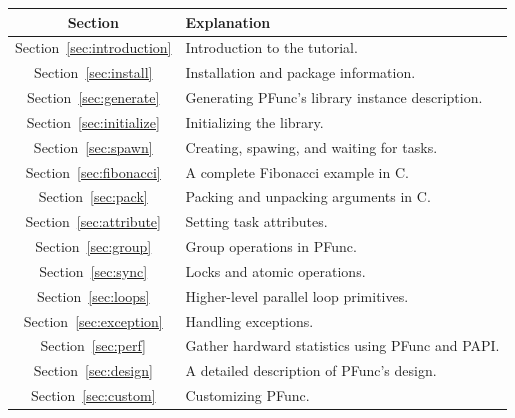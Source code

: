 \begin{center}
\begin{tabular}{|c|l|}
\hline
Section & Explanation \\
\hline
Section~\ref{sec:introduction} & Introduction to the tutorial.\\
\hline
Section~\ref{sec:install} & Installation and package information.\\
\hline
Section~\ref{sec:generate} & Generating PFunc's library instance description.\\
\hline
Section~\ref{sec:initialize} & Initializing the library.\\
\hline
Section~\ref{sec:spawn} & Creating, spawing, and waiting for tasks.\\
\hline
Section~\ref{sec:fibonacci} & A complete Fibonacci example in C. \\
\hline
Section~\ref{sec:pack} & Packing and unpacking arguments in C. \\
\hline
Section~\ref{sec:attribute} & Setting task attributes. \\
\hline
Section~\ref{sec:group} & Group operations in PFunc.\\
\hline
Section~\ref{sec:sync} & Locks and atomic operations.\\
\hline
Section~\ref{sec:loops} & Higher-level parallel loop primitives.\\
\hline
Section~\ref{sec:exception} & Handling exceptions.\\
\hline
Section~\ref{sec:perf} & Gather hardward statistics using PFunc and PAPI.\\
\hline
Section~\ref{sec:design} & A detailed description of PFunc's design.\\
\hline
Section~\ref{sec:custom} & Customizing PFunc. \\
\hline
\end{tabular}
\end{center}
